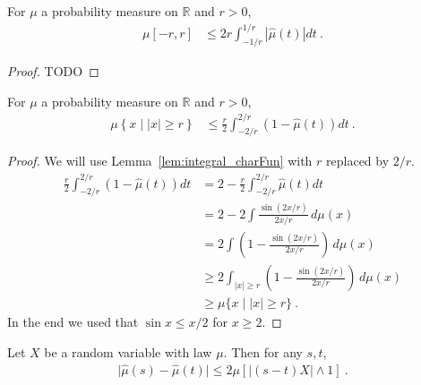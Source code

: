 \begin{lemma}\label{lem:charFun_bound_small}
\leanok
{}
For $\mu$ a probability measure on $\mathbb{R}$ and $r > 0$,
\begin{align*}
\mu [-r, r]
&\le 2 r \int_{-1/r}^{1/r} |\hat{\mu}(t)| dt
\: .
\end{align*}
\end{lemma}

\begin{proof}
TODO
\end{proof}


\begin{lemma}\label{lem:charFun_bound_large}
\leanok
{}
For $\mu$ a probability measure on $\mathbb{R}$ and $r > 0$,
\begin{align*}
\mu \left\{x \mid |x| \ge r\right\}
&\le \frac{r}{2} \int_{-2/r}^{2/r} (1 - \hat{\mu}(t))dt
\: .
\end{align*}
\end{lemma}

\begin{proof}
\leanok
We will use Lemma~\ref{lem:integral_charFun} with $r$ replaced by $2/r$.
\begin{align*}
    \frac{r}{2} \int_{-2/r}^{2/r} (1 - \hat{\mu}(t))dt
    &= 2 - \frac{r}{2} \int_{-2/r}^{2/r} \hat{\mu}(t)dt
    \\
    &= 2 - 2 \int \frac{\sin(2 x / r)}{2 x / r} \, d\mu(x)
    \\
    &= 2 \int \left(1 - \frac{\sin(2 x / r)}{2 x / r}\right) \, d\mu(x)
    \\
    &\ge 2 \int_{|x| \ge r} \left(1 - \frac{\sin(2 x / r)}{2 x / r}\right) \, d\mu(x)
    \\
    &\ge \mu\{x \mid |x| \ge r\}
    \: .
\end{align*}
In the end we used that $\sin x \le x /2$ for $x \ge 2$.
\end{proof}


\begin{lemma}\label{lem:abs_sub_charFun}
\leanok
{}
Let $X$ be a random variable with law $\mu$. Then for any $s, t$,
\begin{align*}
\vert \hat{\mu}(s) - \hat{\mu}(t) \vert
\le 2 \mu\left[ \left\vert (s - t) X\right\vert \wedge 1\right]
\: .
\end{align*}
\end{lemma}

